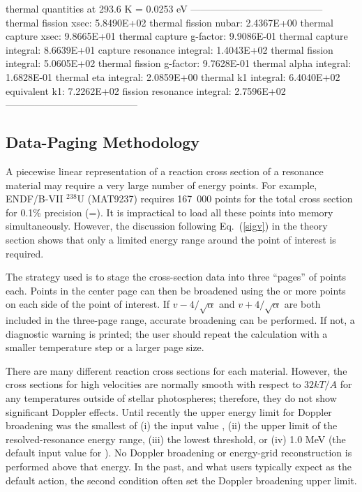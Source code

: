 \small
\begin{ccode}

    thermal quantities at 293.6 K = 0.0253 eV
    -----------------------------------------
           thermal fission xsec:  5.8490E+02
          thermal fission nubar:  2.4367E+00
           thermal capture xsec:  9.8665E+01
       thermal capture g-factor:  9.9086E-01
       thermal capture integral:  8.6639E+01
     capture resonance integral:  1.4043E+02
       thermal fission integral:  5.0605E+02
       thermal fission g-factor:  9.7628E-01
         thermal alpha integral:  1.6828E-01
           thermal eta integral:  2.0859E+00
            thermal k1 integral:  6.4040E+02
                  equivalent k1:  7.2262E+02
     fission resonance integral:  2.7596E+02
    -----------------------------------------

\end{ccode}
\normalsize

\subsection{Data-Paging Methodology}
\label{ssBROADR_paging}

A piecewise linear representation of a reaction cross section of
a resonance material may require a very large number of energy
points.  For example, ENDF/B-VII $^{238}$U (MAT9237) requires 167\ 000
points for the total cross section for 0.1\% precision
(=).  It is impractical to load all these points
into memory simultaneously.  However, the discussion following
Eq.~(\ref{sigv}) in the theory section shows that only a limited
energy range around the point of interest is required.

The strategy used is to stage the cross-section data into three
``pages'' of  points each.  Points in
the center page can then be broadened using the  or
more points on each side of the point of interest.  If
$v-4/\sqrt{\alpha}$ and $v+4/\sqrt{\alpha}$ are both included in
the three-page range, accurate broadening can be performed.  If
not, a diagnostic warning is printed; the user should repeat the
calculation with a smaller temperature step or a larger page
size.

There are many different reaction cross sections for each
material.  However, the cross sections for high velocities are
normally smooth with respect to $32kT/A$ for any temperatures
outside of stellar photospheres; therefore, they do not show
significant Doppler effects.  Until recently the upper energy limit
for Doppler broadening was the smallest of (i) the input value
, (ii) the upper limit of the resolved-resonance
energy range, (iii) the lowest threshold, or (iv) 1.0 MeV
(the default input value for ).  No Doppler
broadening or energy-grid reconstruction is performed
above that energy.  In the past, and what users
typically expect as the default action, the second condition
often set the Doppler broadening upper limit.

